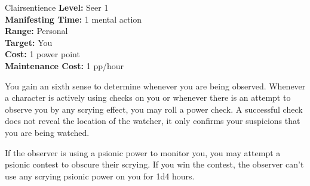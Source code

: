 {Clairsentience}
{
	\textbf{Level:}
	Seer 1\\
	\textbf{Manifesting Time:}
	1 mental action\\
	\textbf{Range:}
	Personal\\
	\textbf{Target:}
	You\\
	\textbf{Cost:}
	1 power point\\
	\textbf{Maintenance Cost:}
	1 pp/hour\\
}
{
	You gain an sixth sense to determine whenever you are being observed. Whenever a character is actively using  checks on you or whenever there is an attempt to observe you by any scrying effect, you may roll a power check. A successful check does not reveal the location of the watcher, it only confirms your suspicions that you are being watched.

	If the observer is using a psionic power to monitor you, you may attempt a psionic contest to obscure their scrying. If you win the contest, the observer can't use any scrying psionic power on you for 1d4 hours.
}